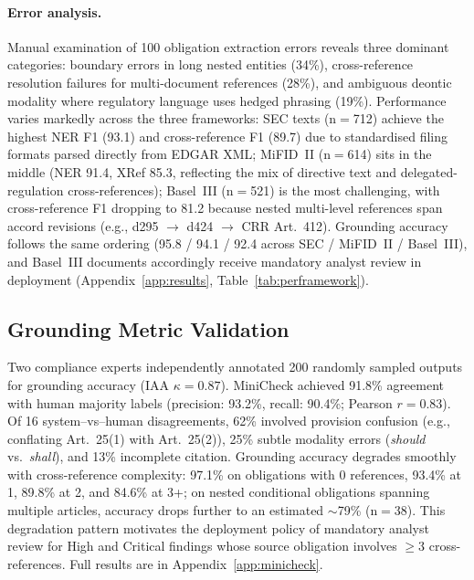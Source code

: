 \documentclass[11pt]{article}
\begin{document}
\paragraph{Error analysis.}  Manual examination of 100 obligation extraction errors reveals three dominant categories: boundary errors in long nested entities (34\%), cross-reference resolution failures for multi-document references (28\%), and ambiguous deontic modality where regulatory language uses hedged phrasing (19\%). Performance varies markedly across the three frameworks: SEC texts (n${=}$712) achieve the highest NER F1 (93.1) and cross-reference F1 (89.7) due to standardised filing formats parsed directly from EDGAR XML; MiFID~II (n${=}$614) sits in the middle (NER 91.4, XRef 85.3, reflecting the mix of directive text and delegated-regulation cross-references); Basel~III (n${=}$521) is the most challenging, with cross-reference F1 dropping to 81.2 because nested multi-level references span accord revisions (e.g., d295 $\to$ d424 $\to$ CRR Art.~412). Grounding accuracy follows the same ordering (95.8 / 94.1 / 92.4 across SEC / MiFID~II / Basel~III), and Basel~III documents accordingly receive mandatory analyst review in deployment (Appendix~\ref{app:results}, Table~\ref{tab:perframework}).

\subsection{Grounding Metric Validation}
\label{sec:minicheck_validation}

Two compliance experts independently annotated 200 randomly sampled outputs for grounding accuracy (IAA $\kappa{=}0.87$). MiniCheck achieved 91.8\% agreement with human majority labels (precision: 93.2\%, recall: 90.4\%; Pearson $r{=}0.83$). Of 16 system--vs--human disagreements, 62\% involved provision confusion (e.g., conflating Art.~25(1) with Art.~25(2)), 25\% subtle modality errors (\emph{should} vs.\ \emph{shall}), and 13\% incomplete citation. Grounding accuracy degrades smoothly with cross-reference complexity: 97.1\% on obligations with 0 references, 93.4\% at 1, 89.8\% at 2, and 84.6\% at 3+; on nested conditional obligations spanning multiple articles, accuracy drops further to an estimated $\sim$79\% (n${=}$38). This degradation pattern motivates the deployment policy of mandatory analyst review for High and Critical findings whose source obligation involves $\geq$3 cross-references. Full results are in Appendix~\ref{app:minicheck}.
\end{document}
